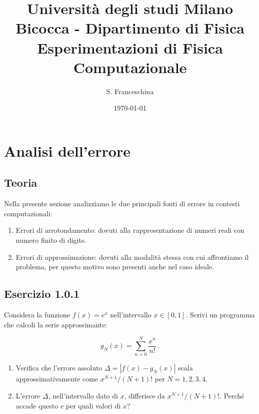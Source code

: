 \documentclass[letterpaper, 12pt]{article}
\begin{document}
\title{{\small Università degli studi Milano Bicocca - Dipartimento di Fisica}\\
	Esperimentazioni di Fisica Computazionale}
\author{S. Franceschina}
\date{\today}
\maketitle
\thispagestyle{logoheader}

\begin{abstract} 
	\begin{adjustwidth}{-1cm}{-1cm}
	\end{adjustwidth}
\end{abstract}
\tableofcontents
\newpage

\section{Analisi dell'errore}
\subsection{Teoria}
Nella presente sezione analizziamo le due principali fonti di errore in contesti computazionali: 
\begin{enumerate}
    \item Errori di arrotondamento: dovuti alla rappresentazione di numeri reali con numero finito di digits.
    \item Errori di approssimazione: dovuti alla modalità stessa con cui affrontiamo il problema, 
          per questo motivo sono presenti anche nel caso ideale. 
\end{enumerate}

\subsection{Esercizio 1.0.1}
Considera la funzione $f(x)=e^x$ nell'intervallo $x\in [0,1]$. Scrivi un programma che calcoli la serie approssimante:

$$
    g_N(x)=\sum_{n=0}^N \frac{x^n}{n!}\,.
$$

\begin{enumerate}
    \item Verifica che l'errore assoluto $\Delta=|f(x)-g_N(x)|$ scala approssimativamente come $x^{N+1}/(N+1)!$ per $N=1,2,3,4$.
    \item L'errore $\Delta$, nell'intervallo dato di $x$, differisce da $x^{N+1}/(N+1)!$. Perché accade questo e per quali valori di $x$?
\end{enumerate}
\end{document}
